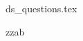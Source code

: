\documentclass{exam}
\begin{document}


\begin{questions}

                                   \printanswers


     {ds_questions.tex}


              \question  zzab



\end{questions}
\end{document}
